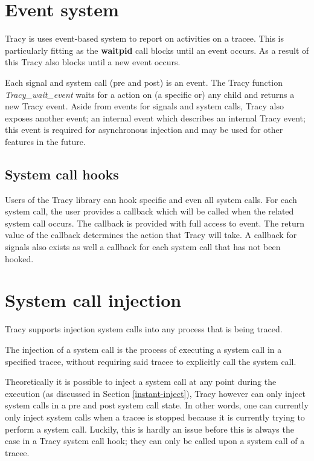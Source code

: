 \documentclass[a4paper, 10pt]{report}
\begin{document}

\section{Event system}
\label{event-system}

Tracy is uses event-based system to report on activities on a tracee. This is
particularly fitting as the \textbf{waitpid} call blocks until an event
occurs. As a result of this Tracy also blocks until a new event occurs.

Each signal and system call (pre and post) is an event.
The Tracy function \textit{Tracy\_wait\_event} waits for a action on
(a specific or) any child and returns a new Tracy event. Aside from
events for signals and system calls, Tracy also exposes another event; an
internal event which describes an internal Tracy event; this event is required
for asynchronous injection and may be used for other features in the future.

\subsection{System call hooks}

Users of the Tracy library can hook specific and even all system calls. For
each system call, the user provides a callback which will be called when
the related system call occurs. The callback is provided with full access to
event. The return value of the callback determines the action that Tracy
will take. A callback for signals also exists as well a callback for each
system call that has not been hooked.

\section{System call injection}
\label{syscall-inject}

Tracy supports injection system calls into any process that is being traced.

The injection of a system call is the process of executing a system call in
a specified tracee, without requiring said tracee to explicitly call the
system call.

Theoretically it is possible to inject a system call at any point during
the execution (as discussed in Section \ref{instant-inject}),
Tracy however can only inject system calls in a pre and post
system call state. In other words, one can currently only inject system calls
when a tracee is stopped because it is currently trying to perform a system
call. Luckily, this is hardly an issue before this is always the case in a
Tracy system call hook; they can only be called upon a system call of a tracee.
\end{document}
